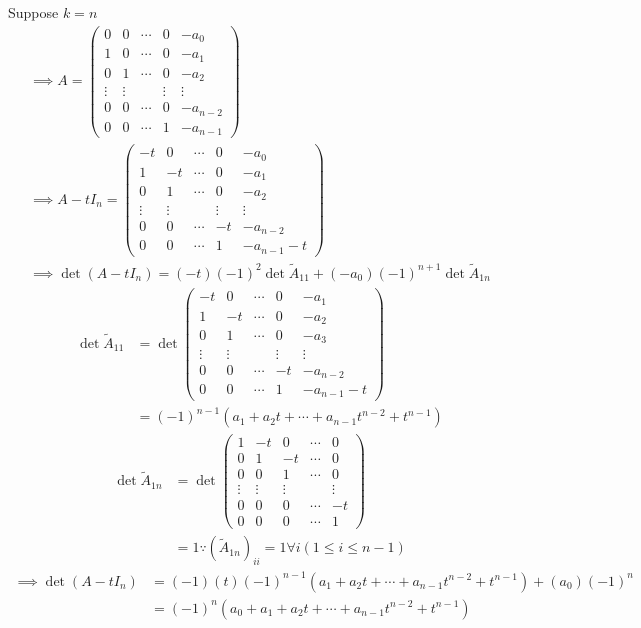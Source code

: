 Suppose $k=n$
\begin{gather}
\implies A =
\begin{pmatrix}
0 & 0 & \cdots & 0 & -a_0\\
1 & 0 & \cdots & 0 & -a_1\\
0 & 1 & \cdots & 0 & -a_2\\
\vdots& \vdots & & \vdots & \vdots\\
0 & 0 & \cdots & 0 & -a_{n-2}\\
0 & 0 & \cdots & 1 & -a_{n-1}
\end{pmatrix}\\
\implies A - tI_n =
\begin{pmatrix}
-t & 0 & \cdots & 0 & -a_0\\
1 & -t & \cdots & 0 & -a_1\\
0 & 1 & \cdots & 0 & -a_2\\
\vdots& \vdots & & \vdots & \vdots\\
0 & 0 & \cdots & -t & -a_{n-2}\\
0 & 0 & \cdots & 1 & -a_{n-1} -t
\end{pmatrix}\\
\implies \det{(A-tI_n)} = (-t)(-1)^2\det{\tilde{A}_{11}} +
(-a_0)(-1)^{n+1}\det{\tilde{A}_{1n}}
\end{gather}
\begin{align}
\det{\tilde{A}_{11}} &= \det{\begin{pmatrix}
-t & 0 & \cdots & 0 & -a_1\\
1 & -t & \cdots & 0 & -a_2\\
0 & 1 & \cdots & 0 & -a_3\\
\vdots& \vdots & & \vdots & \vdots\\
0 & 0 & \cdots & -t & -a_{n-2}\\
0 & 0 & \cdots & 1 & -a_{n-1} -t
  \end{pmatrix}}\\
&= (-1)^{n-1}(a_1 +a_2 t + \dotsb + a_{n-1}t^{n-2} + t^{n-1}) 
\end{align}
\begin{align}
\det{\tilde{A}_{1n}} &= \det{\begin{pmatrix}
1 & -t & 0 & \cdots & 0 \\
0 & 1 & -t & \cdots & 0  \\
0 & 0 & 1 & \cdots & 0  \\
\vdots & \vdots& \vdots & & \vdots \\
0 & 0 & 0 & \cdots & -t \\
0 & 0 & 0 & \cdots & 1 
    \end{pmatrix}}\\
&= 1 \because (\tilde{A}_{1n})_{ii} =1 \forall i (1\leq i \leq n-1)
\end{align}
\begin{align}
\implies \det{(A-tI_n)} &= (-1)(t)(-1)^{n-1}(a_1 +a_2 t + \dotsb +
a_{n-1}t^{n-2} + t^{n-1}) + (a_0)(-1)^n\\
&= (-1)^n(a_0 + a_1 +a_2 t + \dotsb + a_{n-1}t^{n-2} + t^{n-1})
\end{align}
